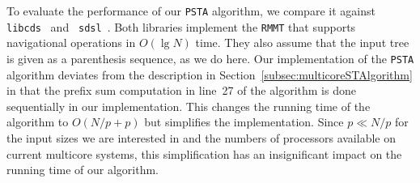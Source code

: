 To evaluate the performance of our {\tt PSTA} algorithm, we compare it against
{\tt libcds}~\cite{libcds} and {\tt
  sdsl}~\cite{sdsl}.
Both libraries implement the {\tt RMMT} that
supports navigational operations in $O(\lg N)$ time.
They also assume that the input tree is given as a parenthesis sequence, as we
do here.
Our implementation of the {\tt PSTA} algorithm deviates from the description in
Section~\ref{subsec:multicoreSTAlgorithm} in that the prefix sum computation in
line~27 of the algorithm is done sequentially in our implementation.
This changes the running time of the algorithm to $O(N/p + p)$ but simplifies the
implementation.
Since $p \ll N/p$ for the input sizes we are interested in and the numbers of
processors available on current multicore systems, this simplification has an
insignificant impact on the running time of our algorithm.
